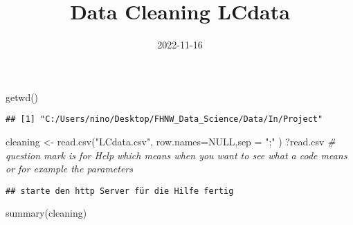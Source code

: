 \documentclass[
]{article}
\title{Data Cleaning LCdata}
\author{}
\date{\vspace{-2.5em}2022-11-16}
\newenvironment{Shaded}{\begin{snugshade}}{\end{snugshade}}
\newcommand{\AttributeTok}[1]{\textcolor[rgb]{0.77,0.63,0.00}{#1}}
\newcommand{\CommentTok}[1]{\textcolor[rgb]{0.56,0.35,0.01}{\textit{#1}}}
\newcommand{\ConstantTok}[1]{\textcolor[rgb]{0.00,0.00,0.00}{#1}}
\newcommand{\FunctionTok}[1]{\textcolor[rgb]{0.00,0.00,0.00}{#1}}
\newcommand{\NormalTok}[1]{#1}
\newcommand{\OtherTok}[1]{\textcolor[rgb]{0.56,0.35,0.01}{#1}}
\newcommand{\StringTok}[1]{\textcolor[rgb]{0.31,0.60,0.02}{#1}}
\begin{document}
\maketitle

\begin{Shaded}
\begin{Highlighting}[]
\FunctionTok{getwd}\NormalTok{()}
\end{Highlighting}
\end{Shaded}

\begin{verbatim}
## [1] "C:/Users/nino/Desktop/FHNW_Data_Science/Data/In/Project"
\end{verbatim}

\begin{Shaded}
\begin{Highlighting}[]
\NormalTok{cleaning }\OtherTok{\textless{}{-}} \FunctionTok{read.csv}\NormalTok{(}\StringTok{"LCdata.csv"}\NormalTok{, }\AttributeTok{row.names=}\ConstantTok{NULL}\NormalTok{,}\AttributeTok{sep =} \StringTok{";"}\NormalTok{ )}
\NormalTok{?read.csv }\CommentTok{\# question mark is for Help which means when you want to see what a code means or for example the parameters }
\end{Highlighting}
\end{Shaded}

\begin{verbatim}
## starte den http Server für die Hilfe fertig
\end{verbatim}

\begin{Shaded}
\begin{Highlighting}[]
\FunctionTok{summary}\NormalTok{(cleaning)}
\end{Highlighting}
\end{Shaded}
\end{document}
